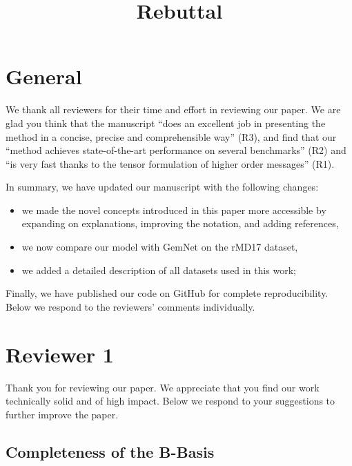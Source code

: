 \documentclass{article}
\title{Rebuttal}
\begin{document}
\maketitle

\section{General}

We thank all reviewers for their time and effort in reviewing our paper.
We are glad you think that the manuscript 
``does an excellent job in presenting the method in a concise, precise and comprehensible way'' (R3),
and find that our ``method achieves state-of-the-art performance on several benchmarks'' (R2) and  ``is very fast thanks to the tensor formulation of higher order messages'' (R1).

In summary, we have updated our manuscript with the following changes:
\begin{itemize}
\item we made the novel concepts introduced in this paper more accessible by expanding on explanations, improving the notation, and adding references,
\item we now compare our model with GemNet on the rMD17 dataset,
\item we added a detailed description of all datasets used in this work;
\end{itemize}
Finally, we have published our code on GitHub for complete reproducibility.
Below we respond to the reviewers' comments individually.

\section{Reviewer 1}

Thank you for reviewing our paper. 
We appreciate that you find our work technically solid and of high impact.
Below we respond to your suggestions to further improve the paper.

\subsection*{Completeness of the B-Basis} 
\end{document}
